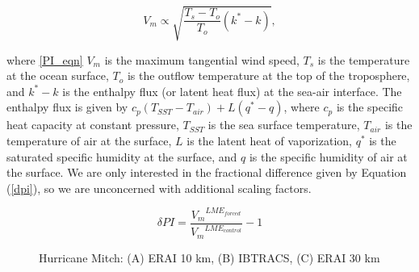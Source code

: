 \begin{equation}
{V_m} \propto \sqrt{\frac{T_s-T_{o}}{T_{o}}(k^{*}-k)},
\label{PI_eqn}
\end{equation}

where \ref{PI_eqn} $V_m$ is the maximum tangential wind speed, $T_s$ is the temperature at the ocean surface, $T_o$ is the outflow temperature at the top of the troposphere, and $k^{*}-k$ is the enthalpy flux (or latent heat flux) at the sea-air interface. The enthalpy flux is given by $c_p(T_{SST}-T_{air})+L(q^{*}-q)$, where $c_p$ is the specific heat capacity at constant pressure, $T_{SST}$ is the sea surface temperature, $T_{air}$ is the temperature of air at the surface, $L$ is the latent heat of vaporization, $q^{*}$ is the saturated specific humidity at the surface, and $q$ is the specific humidity of air at the surface. We are only interested in the fractional difference given by Equation (\ref{dpi}), so we are unconcerned with additional scaling factors.

\begin{equation}
\delta PI = \frac{{V_{m}}^{LME_{forced}}}{{V_{m}}^{LME_{control}}}-1
\label{dpi}
\end{equation}



\begin{figure}[!tbp]
\centering
\caption{Hurricane Mitch: (A) ERAI 10 km, (B) IBTRACS, (C) ERAI 30 km}
\label{mitch_tracks}
\end{figure}

